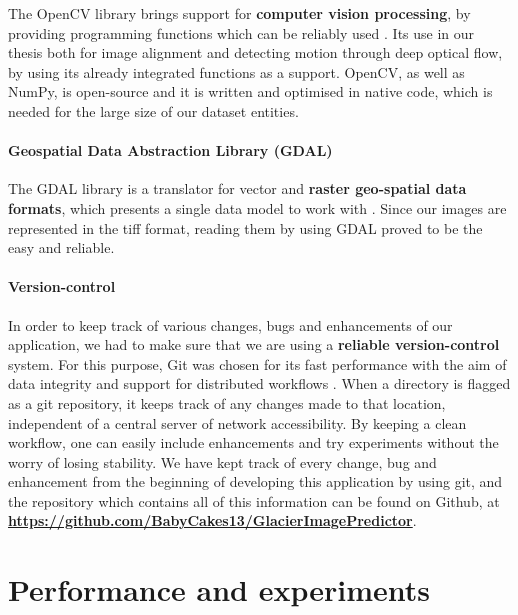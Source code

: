 \documentclass[12pt, a4paper]{report}
\begin{document}
	\par The OpenCV library brings support for \textbf{computer vision processing}, by providing programming functions which can be reliably used \cite{cuda}. Its use in our thesis both for image alignment and detecting motion through deep optical flow, by using its already integrated functions as a support. OpenCV, as well as NumPy, is open-source and it is written and optimised in native code, which is needed for the large size of our dataset entities.
	
	\subsubsection{Geospatial Data Abstraction Library (GDAL)}
	
	\par The GDAL library is a translator for vector and \textbf{raster geo-spatial data formats}, which presents a single data model to work with \cite{gdal}. Since our images are represented in the tiff format, reading them by using GDAL proved to be the easy and reliable.
	
	\subsubsection{Version-control}
	\label{seq:versioning}
	
	\par In order to keep track of various changes, bugs and enhancements of our application, we had to make sure that we are using a \textbf{reliable version-control} system. For this purpose, Git was chosen for its fast performance with the aim of data integrity and support for distributed workflows \cite{git}. When a directory is flagged as a git repository, it keeps track of any changes made to that location, independent of a central server of network accessibility. By keeping a clean workflow, one can easily include enhancements and try experiments without the worry of losing stability. We have kept track of every change, bug and enhancement from the beginning of developing this application by using git, and the repository which contains all of this information can be found on Github, at \textbf{\url{https://github.com/BabyCakes13/GlacierImagePredictor}}.
	
	\newpage{}
	\chapter{Performance and experiments}
\end{document}
